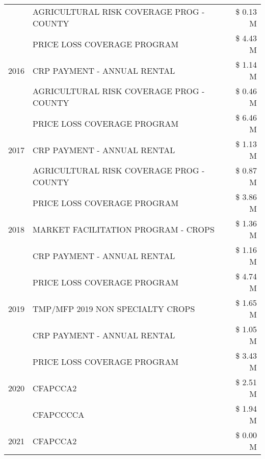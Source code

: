 \begin{tabular}{llr}
 & AGRICULTURAL RISK COVERAGE PROG - COUNTY & \$ 0.13 M \\
\cline{1-3}
\multirow[t]{3}{*}{2016} & PRICE LOSS COVERAGE PROGRAM                   & \$ 4.43 M \\
 & CRP PAYMENT - ANNUAL RENTAL                   & \$ 1.14 M \\
 & AGRICULTURAL RISK COVERAGE PROG - COUNTY      & \$ 0.46 M \\
\cline{1-3}
\multirow[t]{3}{*}{2017} & PRICE LOSS COVERAGE PROGRAM & \$ 6.46 M \\
 & CRP PAYMENT - ANNUAL RENTAL & \$ 1.13 M \\
 & AGRICULTURAL RISK COVERAGE PROG - COUNTY & \$ 0.87 M \\
\cline{1-3}
\multirow[t]{3}{*}{2018} & PRICE LOSS COVERAGE PROGRAM & \$ 3.86 M \\
 & MARKET FACILITATION PROGRAM - CROPS & \$ 1.36 M \\
 & CRP PAYMENT - ANNUAL RENTAL & \$ 1.16 M \\
\cline{1-3}
\multirow[t]{3}{*}{2019} & PRICE LOSS COVERAGE PROGRAM & \$ 4.74 M \\
 & TMP/MFP 2019 NON SPECIALTY CROPS & \$ 1.65 M \\
 & CRP PAYMENT - ANNUAL RENTAL & \$ 1.05 M \\
\cline{1-3}
\multirow[t]{3}{*}{2020} & PRICE LOSS COVERAGE PROGRAM & \$ 3.43 M \\
 & CFAPCCA2 & \$ 2.51 M \\
 & CFAPCCCCA & \$ 1.94 M \\
\cline{1-3}
2021 & CFAPCCA2 & \$ 0.00 M \\
\cline{1-3}
\bottomrule
\end{tabular}
